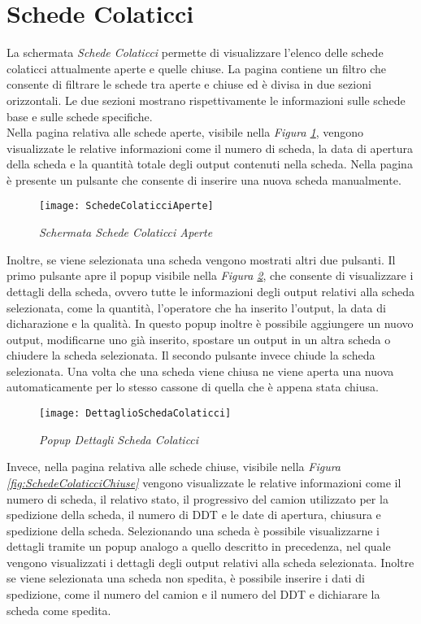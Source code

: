   \section{Schede Colaticci}
  La schermata \textit{Schede Colaticci} permette di visualizzare l'elenco delle schede colaticci
  attualmente aperte e quelle chiuse. La pagina contiene un filtro che consente di filtrare le schede tra aperte e chiuse ed
  è divisa in due sezioni orizzontali. Le due sezioni mostrano rispettivamente le informazioni sulle schede base e sulle schede
  specifiche.\\
  Nella pagina relativa alle schede aperte, visibile nella \textit{Figura \ref{fig:SchedeColaticciAperte}}, vengono
  visualizzate le relative informazioni come il numero di scheda, la data di apertura della scheda e la quantità totale
  degli output contenuti nella scheda. Nella pagina è presente un pulsante che consente di inserire una nuova scheda manualmente. 

  \begin{figure}[H]
    \texttt{[image: SchedeColaticciAperte]}
    \centering
    \caption{\textit{Schermata Schede Colaticci Aperte}}
    \label{fig:SchedeColaticciAperte}
  \end{figure}
    
  Inoltre, se viene selezionata una scheda vengono mostrati altri due pulsanti. Il primo pulsante apre
  il popup visibile nella \textit{Figura \ref{fig:DettaglioSchedaColaticci}}, che consente di visualizzare i dettagli 
  della scheda, ovvero tutte le informazioni degli output relativi alla scheda selezionata, come la quantità, 
  l'operatore che ha inserito l'output, la data di dicharazione e la qualità. In questo popup inoltre è possibile
  aggiungere un nuovo output, modificarne uno già inserito, spostare un output in un altra scheda o chiudere la
  scheda selezionata. Il secondo pulsante invece chiude la scheda selezionata. Una volta che una scheda viene chiusa ne viene
  aperta una nuova automaticamente per lo stesso cassone di quella che è appena stata chiusa.\\
  
  \begin{figure}[H]
    \texttt{[image: DettaglioSchedaColaticci]}
    \centering
    \caption{\textit{Popup Dettagli Scheda Colaticci}}
    \label{fig:DettaglioSchedaColaticci}
  \end{figure}
  
  Invece, nella pagina relativa alle schede chiuse, visibile nella \textit{Figura \ref{fig:SchedeColaticciChiuse}}
  vengono visualizzate le relative informazioni come il numero di scheda,
  il relativo stato, il progressivo del camion utilizzato per la spedizione della scheda, il numero di DDT e le date di apertura,
  chiusura e spedizione della scheda. Selezionando una scheda è possibile visualizzarne i dettagli tramite un popup analogo a
  quello descritto in precedenza, nel quale vengono visualizzati i dettagli degli output relativi alla scheda selezionata.
  Inoltre se viene selezionata una scheda non spedita, è possibile inserire i dati di spedizione, come il numero del camion
  e il numero del DDT e dichiarare la scheda come spedita.

